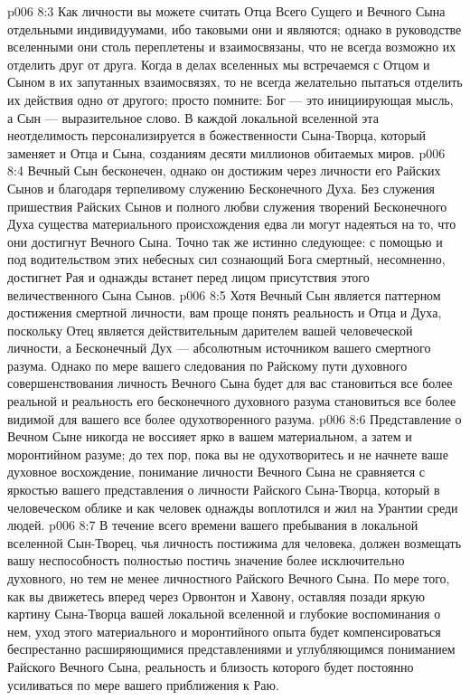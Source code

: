 \vs p006 8:3 Как личности вы можете считать Отца Всего Сущего и Вечного Сына отдельными индивидуумами, ибо таковыми они и являются; однако в руководстве вселенными они столь переплетены и взаимосвязаны, что не всегда возможно их отделить друг от друга. Когда в делах вселенных мы встречаемся с Отцом и Сыном в их запутанных взаимосвязях, то не всегда желательно пытаться отделить их действия одно от другого; просто помните: Бог --- это инициирующая мысль, а Сын --- выразительное слово. В каждой локальной вселенной эта неотделимость персонализируется в божественности Сына\hyp{}Творца, который заменяет и Отца и Сына, созданиям десяти миллионов обитаемых миров.
\vs p006 8:4 Вечный Сын бесконечен, однако он достижим через личности его Райских Сынов и благодаря терпеливому служению Бесконечного Духа. Без служения пришествия Райских Сынов и полного любви служения творений Бесконечного Духа существа материального происхождения едва ли могут надеяться на то, что они достигнут Вечного Сына. Точно так же истинно следующее: с помощью и под водительством этих небесных сил сознающий Бога смертный, несомненно, достигнет Рая и однажды встанет перед лицом присутствия этого величественного Сына Сынов.
\vs p006 8:5 \pc Хотя Вечный Сын является паттерном достижения смертной личности, вам проще понять реальность и Отца и Духа, поскольку Отец является действительным дарителем вашей человеческой личности, а Бесконечный Дух --- абсолютным источником вашего смертного разума. Однако по мере вашего следования по Райскому пути духовного совершенствования личность Вечного Сына будет для вас становиться все более реальной и реальность его бесконечного духовного разума становиться все более видимой для вашего все более одухотворенного разума.
\vs p006 8:6 Представление о Вечном Сыне никогда не воссияет ярко в вашем материальном, а затем и моронтийном разуме; до тех пор, пока вы не одухотворитесь и не начнете ваше духовное восхождение, понимание личности Вечного Сына не сравняется с яркостью вашего представления о личности Райского Сына\hyp{}Творца, который в человеческом облике и как человек однажды воплотился и жил на Урантии среди людей.
\vs p006 8:7 В течение всего времени вашего пребывания в локальной вселенной Сын\hyp{}Творец, чья личность постижима для человека, должен возмещать вашу неспособность полностью постичь значение более исключительно духовного, но тем не менее личностного Райского Вечного Сына. По мере того, как вы движетесь вперед через Орвонтон и Хавону, оставляя позади яркую картину Сына\hyp{}Творца вашей локальной вселенной и глубокие воспоминания о нем, уход этого материального и моронтийного опыта будет компенсироваться беспрестанно расширяющимися представлениями и углубляющимся пониманием Райского Вечного Сына, реальность и близость которого будет постоянно усиливаться по мере вашего приближения к Раю.
